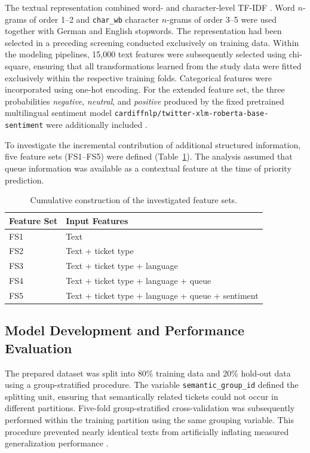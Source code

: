 The textual representation combined word- and character-level TF-IDF \cite{manning2008introduction}. Word $n$-grams of order 1--2 and \texttt{char\_wb} character $n$-grams of order 3--5 were used together with German and English stopwords. The representation had been selected in a preceding screening conducted exclusively on training data. Within the modeling pipelines, 15,000 text features were subsequently selected using chi-square, ensuring that all transformations learned from the study data were fitted exclusively within the respective training folds. Categorical features were incorporated using one-hot encoding. For the extended feature set, the three probabilities \textit{negative}, \textit{neutral}, and \textit{positive} produced by the fixed pretrained multilingual sentiment model \texttt{cardiffnlp/twitter-xlm-roberta-base-sentiment} were additionally included \cite{barbieri2022xlmt}.

To investigate the incremental contribution of additional structured information, five feature sets (FS1–FS5) were defined (Table~\ref{tab:feature_sets}). The analysis assumed that queue information was available as a contextual feature at the time of priority prediction.

\begin{table}[H]
    \centering
    \caption{Cumulative construction of the investigated feature sets.}
    \label{tab:feature_sets}
    \begin{tabular}{ll}
        \toprule
        Feature Set & Input Features \\
        \midrule
        FS1 & Text \\
        FS2 & Text + ticket type \\
        FS3 & Text + ticket type + language \\
        FS4 & Text + ticket type + language + queue \\
        FS5 & Text + ticket type + language + queue + sentiment \\
        \bottomrule
    \end{tabular}
\end{table}

\subsection{Model Development and Performance Evaluation}

The prepared dataset was split into 80\% training data and 20\% hold-out data using a group-stratified procedure. The variable \texttt{semantic\_group\_id} defined the splitting unit, ensuring that semantically related tickets could not occur in different partitions. Five-fold group-stratified cross-validation was subsequently performed within the training partition using the same grouping variable. This procedure prevented nearly identical texts from artificially inflating measured generalization performance \cite{kaufman2012leakage}.

